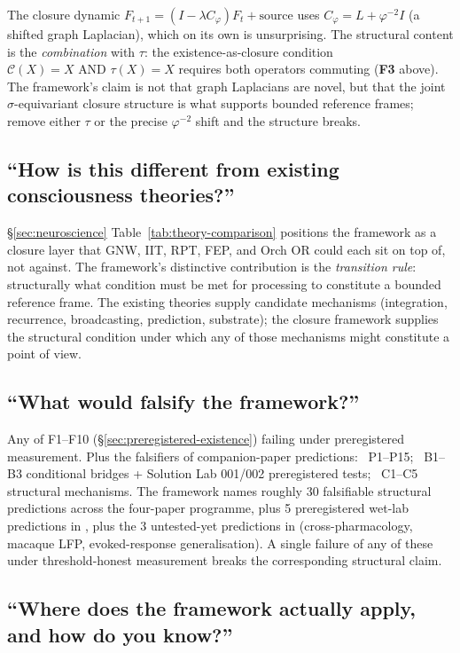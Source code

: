 \documentclass[11pt]{article}
\theoremstyle{plain}
\theoremstyle{definition}
\theoremstyle{remark}
\newcommand{\Ccal}{\mathcal{C}}
\newcommand{\Cph}{C_\varphi}
\begin{document}
The closure dynamic $F_{t+1} = (I - \lambda \Cph) F_t + \text{source}$ uses $\Cph = L + \varphi^{-2} I$ (a shifted graph Laplacian), which on its own is unsurprising. The structural content is the \emph{combination} with $\tau$: the existence-as-closure condition $\Ccal(X) = X \text{ AND } \tau(X) = X$ requires both operators commuting (\textbf{F3} above). The framework's claim is not that graph Laplacians are novel, but that the joint $\sigma$-equivariant closure structure is what supports bounded reference frames; remove either $\tau$ or the precise $\varphi^{-2}$ shift and the structure breaks.

\subsection{``How is this different from existing consciousness theories?''}

\S\ref{sec:neuroscience} Table~\ref{tab:theory-comparison} positions the framework as a closure layer that GNW, IIT, RPT, FEP, and Orch OR could each sit on top of, not against. The framework's distinctive contribution is the \emph{transition rule}: structurally what condition must be met for processing to constitute a bounded reference frame. The existing theories supply candidate mechanisms (integration, recurrence, broadcasting, prediction, substrate); the closure framework supplies the structural condition under which any of those mechanisms might constitute a point of view.

\subsection{``What would falsify the framework?''}

Any of F1--F10 (\S\ref{sec:preregistered-existence}) failing under preregistered measurement. Plus the falsifiers of companion-paper predictions:~\citep{SmartLifeAsClosure} P1--P15;~\citep{SmartProcessingToPOV} B1--B3 conditional bridges + Solution Lab 001/002 preregistered tests;~\citep{SmartCosmicClosure} C1--C5 structural mechanisms. The framework names roughly 30 falsifiable structural predictions across the four-paper programme, plus 5 preregistered wet-lab predictions in \citet{SolutionLab001}, plus the 3 untested-yet predictions in \citet{SolutionLab002} (cross-pharmacology, macaque LFP, evoked-response generalisation). A single failure of any of these under threshold-honest measurement breaks the corresponding structural claim.

\subsection{``Where does the framework actually apply, and how do you know?''}
\end{document}
